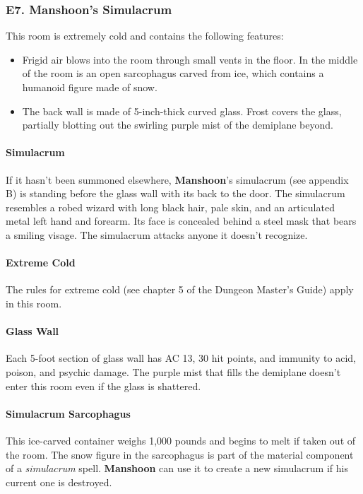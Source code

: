 \documentclass[10pt,a4paper,twoside,twocolumn,openany,nodeprecatedcode]{dndbook}
\begin{document}
\subsubsection{E7. Manshoon's Simulacrum}
This room is extremely cold and contains the following features:
\begin{itemize}

\item Frigid air blows into the room through small vents in the floor. In the middle of the room is an open sarcophagus carved from ice, which contains a humanoid figure made of snow.
\item The back wall is made of 5-inch-thick curved glass. Frost covers the glass, partially blotting out the swirling purple mist of the demiplane beyond.
\end{itemize}


\paragraph{Simulacrum}
If it hasn't been summoned elsewhere, \textbf{Manshoon}'s simulacrum (see appendix B) is standing before the glass wall with its back to the door. The simulacrum resembles a robed wizard with long black hair, pale skin, and an articulated metal left hand and forearm. Its face is concealed behind a steel mask that bears a smiling visage. The simulacrum attacks anyone it doesn't recognize.
\paragraph{Extreme Cold}
The rules for extreme cold (see chapter 5 of the Dungeon Master's Guide) apply in this room.
\paragraph{Glass Wall}
Each 5-foot section of glass wall has AC 13, 30 hit points, and immunity to acid, poison, and psychic damage. The purple mist that fills the demiplane doesn't enter this room even if the glass is shattered.
\paragraph{Simulacrum Sarcophagus}
This ice-carved container weighs 1,000 pounds and begins to melt if taken out of the room. The snow figure in the sarcophagus is part of the material component of a \textit{simulacrum} spell. \textbf{Manshoon} can use it to create a new simulacrum if his current one is destroyed.
\end{document}
